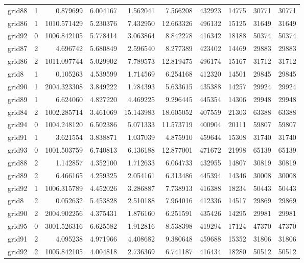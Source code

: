 \begin{longtable}{|l|r|r|r|r|r|r|r|r|r|}
grid88 & 1 & 0.879699 & 6.004167 & 1.562041 & 7.566208 & 432923 & 14775 & 30771 & 30771 \\
grid86 & 1 & 1010.571429 & 5.230376 & 7.432950 & 12.663326 & 496132 & 15125 & 31649 & 31649 \\
grid92 & 0 & 1006.842105 & 5.778414 & 3.063864 & 8.842278 & 416342 & 18188 & 50374 & 50374 \\
grid87 & 2 & 4.696742 & 5.680849 & 2.596540 & 8.277389 & 423402 & 14469 & 29883 & 29883 \\
grid86 & 2 & 1011.097744 & 5.029902 & 7.789573 & 12.819475 & 496174 & 15167 & 31712 & 31712 \\
grid8 & 1 & 0.105263 & 4.539599 & 1.714569 & 6.254168 & 412320 & 14501 & 29845 & 29845 \\
grid90 & 1 & 2004.323308 & 3.849222 & 1.784393 & 5.633615 & 435388 & 14257 & 29924 & 29924 \\
grid89 & 1 & 6.624060 & 4.827220 & 4.469225 & 9.296445 & 445354 & 14306 & 29948 & 29948 \\
grid84 & 2 & 1002.285714 & 3.461069 & 15.143983 & 18.605052 & 407559 & 21303 & 63388 & 63388 \\
grid94 & 0 & 1004.248120 & 6.502386 & 5.071333 & 11.573719 & 400904 & 20111 & 59807 & 59807 \\
grid91 & 1 & 3.621554 & 3.838871 & 1.037039 & 4.875910 & 459644 & 15308 & 31740 & 31740 \\
grid93 & 0 & 1001.503759 & 6.740813 & 6.136188 & 12.877001 & 471672 & 21998 & 65139 & 65139 \\
grid88 & 2 & 1.142857 & 4.352100 & 1.712633 & 6.064733 & 432955 & 14807 & 30819 & 30819 \\
grid89 & 2 & 6.466165 & 4.259325 & 2.054161 & 6.313486 & 445394 & 14346 & 30008 & 30008 \\
grid92 & 1 & 1006.315789 & 4.452026 & 3.286887 & 7.738913 & 416388 & 18234 & 50443 & 50443 \\
grid8 & 2 & 0.052632 & 5.453828 & 2.510188 & 7.964016 & 412336 & 14517 & 29869 & 29869 \\
grid90 & 2 & 2004.902256 & 4.375431 & 1.876160 & 6.251591 & 435426 & 14295 & 29981 & 29981 \\
grid95 & 0 & 3001.526316 & 6.625582 & 1.912816 & 8.538398 & 419294 & 17124 & 47370 & 47370 \\
grid91 & 2 & 4.095238 & 4.971966 & 4.408682 & 9.380648 & 459688 & 15352 & 31806 & 31806 \\
grid92 & 2 & 1005.842105 & 4.004818 & 2.736369 & 6.741187 & 416434 & 18280 & 50512 & 50512 \\

\end{longtable}
